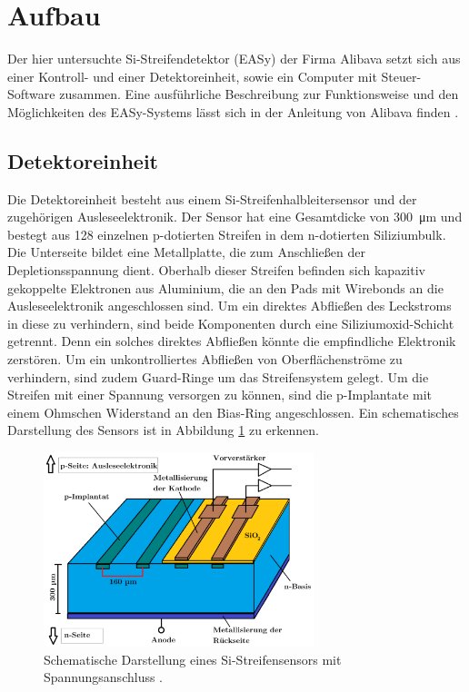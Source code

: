 \newpage
\section{Aufbau}
\label{sec:Aufbau}
Der hier untersuchte Si-Streifendetektor (EASy) der Firma Alibava setzt sich aus einer Kontroll- und einer Detektoreinheit, sowie ein Computer mit Steuer-Software zusammen. Eine ausführliche Beschreibung zur Funktionsweise und den Möglichkeiten des EASy-Systems lässt sich in der Anleitung von Alibava finden \cite{alibava}.

\subsection{Detektoreinheit}
\label{sec:Detektoreinheit}
 Die Detektoreinheit besteht aus einem Si-Streifenhalbleitersensor und der zugehörigen Ausleseelektronik. Der Sensor hat eine Gesamtdicke von \SI{300}{\micro\meter} und bestegt aus 128 einzelnen p-dotierten Streifen in dem n-dotierten Siliziumbulk. Die Unterseite bildet eine Metallplatte, die zum Anschließen der Depletionsspannung dient. Oberhalb dieser Streifen befinden sich kapazitiv gekoppelte Elektronen aus Aluminium, die an den Pads mit Wirebonds an die Ausleseelektronik angeschlossen sind. Um ein direktes Abfließen des Leckstroms in diese zu verhindern, sind beide Komponenten durch eine Siliziumoxid-Schicht getrennt. Denn ein solches direktes Abfließen könnte die empfindliche Elektronik zerstören. Um ein unkontrolliertes Abfließen von Oberflächenströme zu verhindern, sind zudem Guard-Ringe um das Streifensystem gelegt. Um die Streifen mit einer Spannung versorgen zu können, sind die p-Implantate mit einem Ohmschen Widerstand an den Bias-Ring angeschlossen.
 Ein schematisches Darstellung des Sensors ist in Abbildung \ref{fig:schema} zu erkennen.
 \begin{figure}[htb]
   \centering
   \includegraphics[width=0.7\textwidth]{graphics/Schema.png}
   \caption{Schematische Darstellung eines Si-Streifensensors mit Spannungsanschluss \cite{anleitung}.}
   \label{fig:schema}
 \end{figure}
